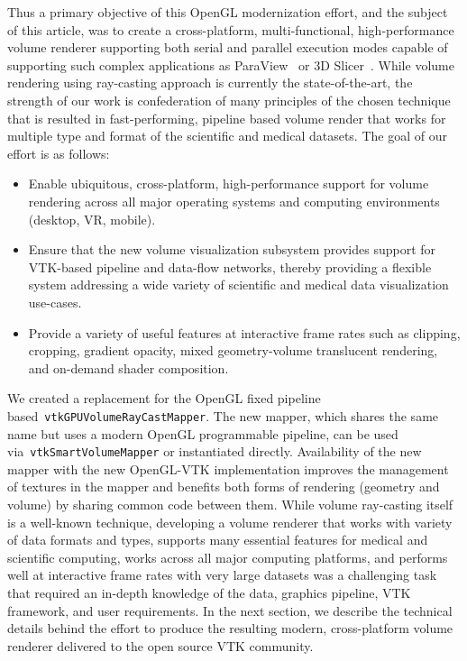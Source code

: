 Thus a primary objective of this OpenGL modernization effort, and the
subject of this article, was to create a cross-platform, multi-functional,
high-performance volume renderer supporting both serial and parallel execution
modes capable of supporting such complex applications as
ParaView~\citep{ahrens_paraview:_2005,ayachit_paraview_2015} or 3D
Slicer~\citep{fedorov_3d_2012}.  While volume rendering using ray-casting
approach is currently the state-of-the-art, the strength of our work is confederation of many principles of the chosen technique that is resulted in fast-performing, pipeline based volume render that works for multiple type and format of the scientific and medical datasets. The goal of our effort is as follows:

\begin{itemize}
  \item Enable ubiquitous, cross-platform, high-performance support for volume
    rendering across all major operating systems and computing environments
    (desktop, VR, mobile).

  \item Ensure that the new volume visualization subsystem provides support for
    VTK-based pipeline and data-flow networks, thereby providing a flexible
    system addressing a wide variety of scientific and medical data
    visualization use-cases.

  \item Provide a variety of useful features at interactive frame rates such as
    clipping, cropping, gradient opacity, mixed geometry-volume translucent
    rendering, and on-demand shader composition.
\end{itemize}

We created a replacement for the OpenGL fixed pipeline
based~\texttt{vtkGPUVolumeRayCastMapper}. The new mapper, which shares the same
name but uses a modern OpenGL programmable pipeline, can be used
via~\texttt{vtkSmartVolumeMapper} or instantiated directly. Availability of the
new mapper with the new OpenGL-VTK implementation improves the management of
textures in the mapper and benefits both forms of rendering (geometry and
volume) by sharing common code between them. While volume ray-casting itself is
a well-known technique, developing a volume renderer that works with variety of
data formats and types, supports many essential features for medical and
scientific computing, works across all major computing platforms, and performs
well at interactive frame rates with very large datasets was a challenging task
that required an in-depth knowledge of the data, graphics pipeline, VTK
framework, and user requirements.  In the next section, we describe the
technical details behind the effort to produce the resulting modern,
cross-platform volume renderer delivered to the open source VTK community.
